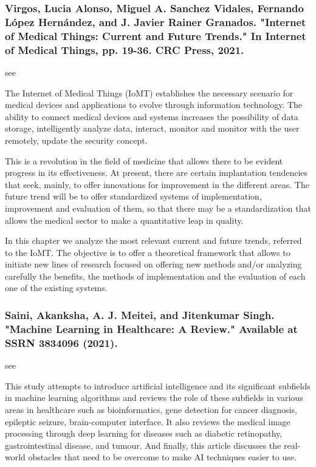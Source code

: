 \documentclass[conference]{IEEEtran}
\begin{document}
\medskip
\subsubsection{Virgos, Lucia Alonso, Miguel A. Sanchez Vidales, Fernando López Hernández, and J. Javier Rainer Granados. "Internet of Medical Things: Current and Future Trends." In Internet of Medical Things, pp. 19-36. CRC Press, 2021.}
see \cite{virgos2021internet}

The Internet of Medical Things (IoMT) establishes the necessary scenario for medical devices and applications to evolve through information technology. The ability to connect medical devices and systems increases the possibility of data storage, intelligently analyze data, interact, monitor and monitor with the user remotely, update the security concept.

This is a revolution in the field of medicine that allows there to be evident progress in its effectiveness. At present, there are certain implantation tendencies that seek, mainly, to offer innovations for improvement in the different areas. The future trend will be to offer standardized systems of implementation, improvement and evaluation of them, so that there may be a standardization that allows the medical sector to make a quantitative leap in quality.

In this chapter we analyze the most relevant current and future trends, referred to the IoMT. The objective is to offer a theoretical framework that allows to initiate new lines of research focused on offering new methods and/or analyzing carefully the benefits, the methods of implementation and the evaluation of each one of the existing systems.

\medskip
\subsubsection{Saini, Akanksha, A. J. Meitei, and Jitenkumar Singh. "Machine Learning in Healthcare: A Review." Available at SSRN 3834096 (2021).}
see \cite{saini2021machine}

This study attempts to introduce artificial intelligence and its significant subfields in machine learning algorithms and reviews the role of these subfields in various areas in healthcare such as bioinformatics, gene detection for cancer diagnosis, epileptic seizure, brain-computer interface. It also reviews the medical image processing through deep learning for diseases such as diabetic retinopathy, gastrointestinal disease, and tumour. And finally, this article discusses the real-world obstacles that need to be overcome to make AI techniques easier to use.
\end{document}

